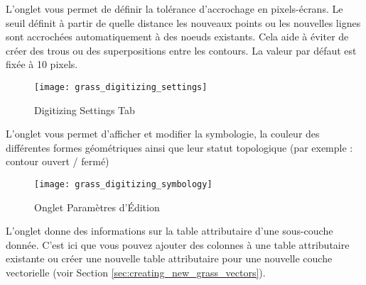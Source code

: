 {%
\label{label_settingtab}

L'onglet  vous permet de définir la tolérance d'accrochage en pixels-écrans. Le seuil définit à partir de quelle distance les nouveaux points ou les nouvelles lignes sont accrochées automatiquement à des noeuds existants. Cela aide à éviter de créer des trous ou des superpositions entre les contours. La valeur par défaut est fixée à 10 pixels.

\begin{figure}[ht]
 \begin{center}
 \texttt{[image: grass\_digitizing\_settings]}
 \caption{\grass Digitizing Settings Tab \nixcaption}\label{fig:grass_digitizing_settings}
 \end{center}
\end{figure}


L'onglet  vous permet d'afficher et modifier la symbologie, la couleur des différentes formes géométriques ainsi que leur statut topologique (par exemple : contour ouvert / fermé)

\begin{figure}[ht]
 \begin{center}
 \texttt{[image: grass\_digitizing\_symbology]}
  \caption{Onglet Paramètres d'Édition \grass \nixcaption}\label{fig:grass_digitizing_settingsTODO}
 \end{center}
\end{figure}

 
L'onglet  donne des informations sur la table attributaire d'une sous-couche donnée. C'est ici que vous pouvez ajouter des colonnes à une table attributaire existante ou créer une nouvelle table attributaire pour une nouvelle couche vectorielle \grass (voir Section \ref{sec:creating_new_grass_vectors}).

}
